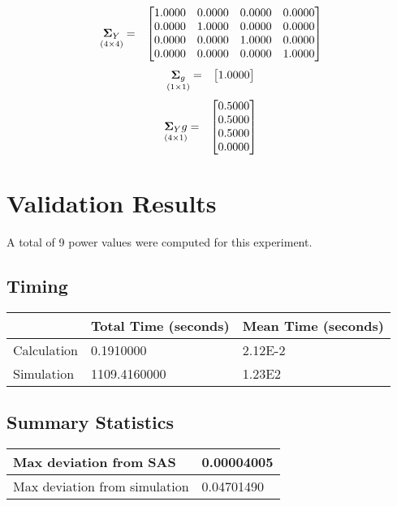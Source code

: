 \documentclass{glimmpse-report}
\begin{document}
\begin{eqnarray*}
\underset{\left(4\times4\right)}{\mathbf{\Sigma}_Y} & = & \begin{bmatrix}1.0000 & 0.0000 & 0.0000 & 0.0000\protect\\
0.0000 & 1.0000 & 0.0000 & 0.0000\protect\\
0.0000 & 0.0000 & 1.0000 & 0.0000\protect\\
0.0000 & 0.0000 & 0.0000 & 1.0000\protect\\
\end{bmatrix}
\end{eqnarray*}
\begin{eqnarray*}
\underset{\left(1\times1\right)}{\mathbf{\Sigma}_g} & = & \begin{bmatrix}1.0000\protect\\
\end{bmatrix}
\end{eqnarray*}
\begin{eqnarray*}
\underset{\left(4\times1\right)}{\mathbf{\Sigma}_Yg} & = & \begin{bmatrix}0.5000\protect\\
0.5000\protect\\
0.5000\protect\\
0.0000\protect\\
\end{bmatrix}
\end{eqnarray*}
\section{Validation Results}
A total of 9 power values were computed for this experiment.

\subsection{Timing}
\begin{tabular}{|l|l|l|}
\hline
 & Total Time (seconds) & Mean Time (seconds) \\
\hline
Calculation & 0.1910000 & 2.12E-2\tabularnewline
\hline
Simulation & 1109.4160000 & 1.23E2\tabularnewline
\hline
\end{tabular}
\subsection{Summary Statistics}
\begin{tabular}{|l|l|}
\hline
Max deviation from SAS & 0.00004005\tabularnewline
\hline

Max deviation from simulation & 0.04701490\tabularnewline
\hline

\end{tabular}
\end{document}

